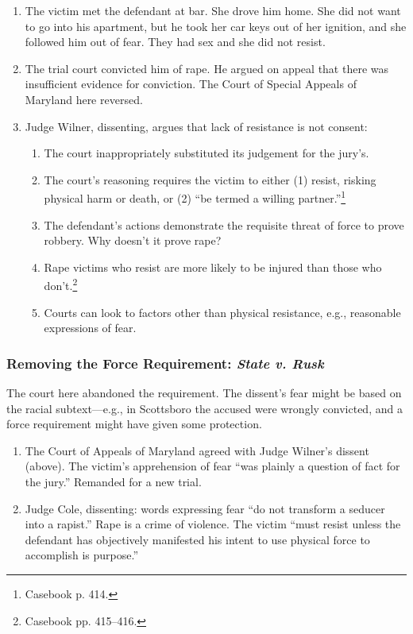 \begin{enumerate}
    \item The victim met the defendant at bar. She drove him home. She did not 
    want to go into his apartment, but he took her car keys out of her 
    ignition, and she followed him out of fear. They had sex and she did not 
    resist.
    \item The trial court convicted him of rape. He argued on appeal that 
    there was insufficient evidence for conviction. The Court of Special 
    Appeals of Maryland here reversed.
    \item Judge Wilner, dissenting, argues that lack of resistance is not 
    consent:
    \begin{enumerate}
        \item The court inappropriately substituted its judgement for the 
        jury's.
        \item The court's reasoning requires the victim to either (1) resist, 
        risking physical harm or death, or (2) ``be termed a willing 
        partner.''\footnote{Casebook p. 414.}
        \item The defendant's actions demonstrate the requisite threat of 
        force to prove robbery. Why doesn't it prove rape?
        \item Rape victims who resist are more likely to be injured than those 
        who don't.\footnote{Casebook pp. 415--416.}
        \item Courts can look to factors other than physical resistance, e.g., 
        reasonable expressions of fear.
    \end{enumerate}
\end{enumerate}

\subsubsection{Removing the Force Requirement: \emph{State v. Rusk}}

The court here abandoned the requirement. The dissent's fear might be based on 
the racial subtext---e.g., in Scottsboro the accused were wrongly convicted, 
and a force requirement might have given some protection.

\begin{enumerate}
    \item The Court of Appeals of Maryland agreed with Judge Wilner's dissent 
    (above). The victim's apprehension of fear ``was plainly a question of 
    fact for the jury.'' Remanded for a new trial.
    \item Judge Cole, dissenting: words expressing fear ``do not transform a 
    seducer into a rapist.'' Rape is a crime of violence. The victim ``must 
    resist unless the defendant has objectively manifested his intent to use 
    physical force to accomplish is purpose.''
\end{enumerate}

